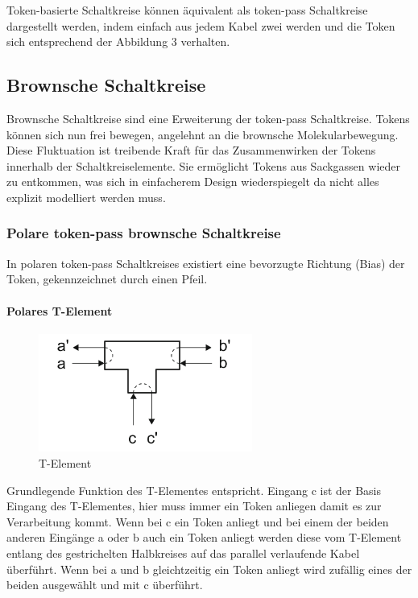 \documentclass[11pt,a4paper]{article}
\begin{document}
Token-basierte Schaltkreise können äquivalent als token-pass Schaltkreise 
dargestellt werden, indem einfach aus jedem Kabel zwei werden und die Token 
sich entsprechend der Abbildung 3 verhalten.


\subsection{Brownsche Schaltkreise}
Brownsche Schaltkreise sind eine Erweiterung der token-pass Schaltkreise. 
%
Tokens können sich nun frei bewegen, angelehnt an die
brownsche Molekularbewegung.
%
Diese Fluktuation ist treibende Kraft für das Zusammenwirken der Tokens 
innerhalb der Schaltkreiselemente. 
%
Sie ermöglicht Tokens aus Sackgassen wieder zu entkommen,
was sich in einfacherem Design wiederspiegelt da nicht alles explizit 
modelliert werden muss.


\subsubsection{Polare token-pass brownsche Schaltkreise}
In polaren token-pass Schaltkreises existiert eine bevorzugte Richtung (Bias)
der Token, gekennzeichnet durch einen Pfeil.
%

\paragraph{Polares T-Element}
\begin{figure}[h]
    \centering
    \includegraphics[width=7cm]{bilder/T_Element.png}
    \caption{T-Element}
    \label{fig:T_Element}
\end{figure}

Grundlegende Funktion des T-Elementes entspricht. 
%
Eingang c ist der Basis Eingang des T-Elementes, hier muss immer ein Token
anliegen damit es zur Verarbeitung kommt.
%
Wenn bei c ein Token anliegt und bei einem der beiden anderen
Eingänge a oder b auch ein Token anliegt werden diese vom T-Element 
entlang des gestrichelten Halbkreises auf das parallel verlaufende 
Kabel überführt.
%
Wenn bei a und b gleichtzeitig ein Token anliegt wird zufällig 
eines der beiden ausgewählt und mit c überführt.
 
\end{document}

